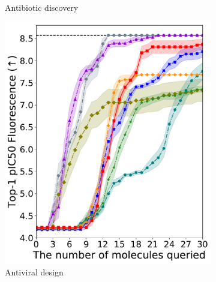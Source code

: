 \begin{figure}[ht]
\begin{subfigure}{.24\textwidth}
            \caption{Antibiotic discovery}
            \label{fig:bo-antibiotic}
        \end{subfigure}
        \begin{subfigure}{.24\textwidth}
            \centering
            \includegraphics[width=\textwidth]{BO-covid.pdf}
            \caption{Antiviral design}  %
            \label{fig:bo-covid}
        \end{subfigure}
        \hfill
        \begin{subfigure}{.24\textwidth}
            \centering

\end{subfigure}
\end{figure}
